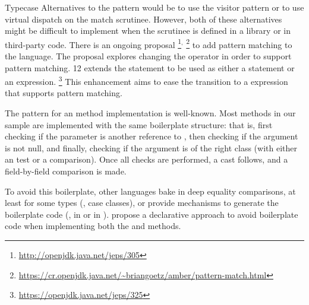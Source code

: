 \begin{pattern}{Typecase}
Alternatives to the \thisp{} pattern would be to use the visitor pattern or to
use virtual dispatch on the match scrutinee.
However, both of these
alternatives might be difficult to implement when the scrutinee is defined in
a library or in third-party code.
There is an ongoing proposal%
\footnote{\url{http://openjdk.java.net/jeps/305}}$^{,}$%
\footnote{\url{https://cr.openjdk.java.net/~briangoetz/amber/pattern-match.html}}
to add pattern matching to the \java{} language.
The proposal explores changing the  operator in order to support pattern matching.
%
%
\java{} 12 extends the  statement to be used as either a statement or an expression.%
\footnote{\url{https://openjdk.java.net/jeps/325}}
This enhancement aims to ease the transition to a  expression that supports pattern matching.

The pattern for an  method implementation is well-known.
Most  methods in our sample are implemented with the same
boilerplate structure:
that is, first checking if the parameter is another reference to ,
then checking if the argument is not null,
and finally, checking if the argument is of the right class
(with either an  test or a  comparison).
Once all checks are performed, a cast follows, and a field-by-field comparison is made.

To avoid this boilerplate, other languages bake in deep equality comparisons, at least for some types
(\eg, \scala{} case classes),
or provide mechanisms to generate the boilerplate code (\eg, 
in \haskell{} or \code{\#[derive(Eq)]} in \rust{}).
\cite{vaziriDeclarativeObjectIdentity2007} propose a declarative approach to avoid boilerplate code when implementing
both the  and  methods.










\end{pattern}
